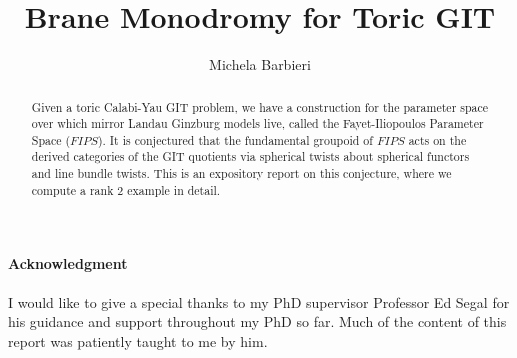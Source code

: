 \documentclass[oneside]{amsart}
\title{Brane Monodromy for Toric GIT}
\author[]{Michela Barbieri}
\theoremstyle{definition}
\theoremstyle{definition}
\theoremstyle{definition}
\theoremstyle{definition}
\begin{document}
\maketitle
\tableofcontents

\begin{abstract}
    Given a toric Calabi-Yau GIT problem, we have a construction for the parameter space over which mirror Landau Ginzburg models live, called the Fayet-Iliopoulos Parameter Space ($FIPS$). It is conjectured that the fundamental groupoid of $FIPS$ acts on the derived categories of the GIT quotients via spherical twists about spherical functors and line bundle twists. This is an expository report on this conjecture, where we compute a rank 2 example in detail.
\end{abstract}

\paragraph*{Acknowledgment}
I would like to give a special thanks to my PhD supervisor Professor Ed Segal for his guidance and support throughout my PhD so far. Much of the content of this report was patiently taught to me by him. 
\end{document}
